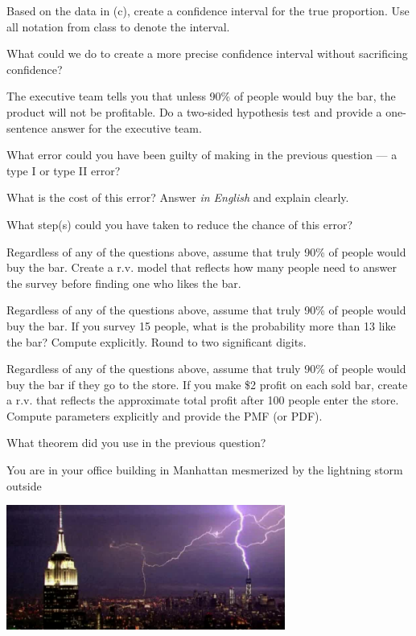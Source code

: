 \documentclass[12pt]{article}
\begin{document}
 Based on the data in (c), create a confidence interval for the true proportion. Use all notation from class to denote the interval.  

 What could we do to create a more precise confidence interval without sacrificing confidence?  

 The executive team tells you that unless 90\% of people would buy the bar, the product will not be profitable. Do a two-sided hypothesis test and provide a one-sentence answer for the executive team.  


 What error could you have been guilty of making in the previous question --- a type I or type II error?  

 What is the cost of this error? Answer \emph{in English} and explain clearly.  

 What step(s) could you have taken to reduce the chance of this error?  

 Regardless of any of the questions above, assume that truly 90\% of people would buy the bar. Create a r.v. model that reflects how many people need to answer the survey before finding one who likes the bar. 


 Regardless of any of the questions above, assume that truly 90\% of people would buy the bar. If you survey 15 people, what is the probability more than 13 like the bar? Compute explicitly. Round to two significant digits.  

 Regardless of any of the questions above, assume that truly 90\% of people would buy the bar if they go to the store. If you make \$2 profit on each sold bar, create a r.v. that reflects the approximate total profit after 100 people enter the store. Compute parameters explicitly and provide the PMF (or PDF). 

 What theorem did you use in the previous question? 


\eenum


\problem You are in your office building in Manhattan mesmerized by the lightning storm outside

\begin{center}
\includegraphics[width=3.6in]{lightning.png}
\end{center}
\end{document}
